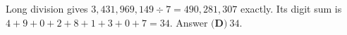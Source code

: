 Long division gives $3{,}431{,}969{,}149\div7=490{,}281{,}307$ exactly. Its digit sum is $4+9+0+2+8+1+3+0+7=34$. Answer $\boxed{\textbf{(D)}\ 34}$.
